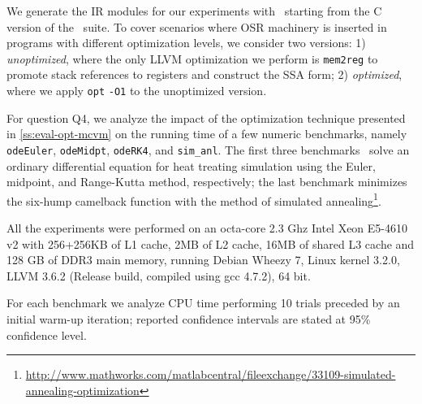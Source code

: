 \begin{description}
We generate the IR modules for our experiments with \clang\ starting from the C version of the \shootout\ suite. To cover scenarios where OSR machinery is inserted in programs with different optimization levels, we consider two versions: 1) {\em unoptimized}, where the only LLVM optimization we perform is {\tt mem2reg} to promote stack references to registers and construct the SSA form; 2) {\em optimized}, where we apply {\tt opt} {\tt -O1} to the unoptimized version.


For question Q4, we analyze the impact of the optimization technique presented in \mysection\ref{ss:eval-opt-mcvm} on the running time of a few numeric benchmarks, namely {\tt odeEuler}, {\tt odeMidpt}, {\tt odeRK4}, and {\tt sim\_anl}. The first three benchmarks~\cite{recktenwald2000numerical} solve an ordinary differential equation for heat treating simulation using the Euler, midpoint, and Range-Kutta method, respectively; the last benchmark minimizes the six-hump camelback function with the method of simulated annealing\footnote{\url{http://www.mathworks.com/matlabcentral/fileexchange/33109-simulated-annealing-optimization}}.


All the experiments were performed on an octa-core 2.3 Ghz Intel Xeon E5-4610 v2 with 256+256KB of L1 cache, 2MB of L2 cache, 16MB of shared L3 cache and 128 GB of DDR3 main memory, running Debian Wheezy 7, Linux kernel 3.2.0,
LLVM 3.6.2 (Release build, compiled using gcc 4.7.2), 64 bit.

For each benchmark we analyze CPU time performing 10 trials preceded by an initial warm-up iteration; reported confidence intervals are stated at 95\% confidence level.


\end{description}
